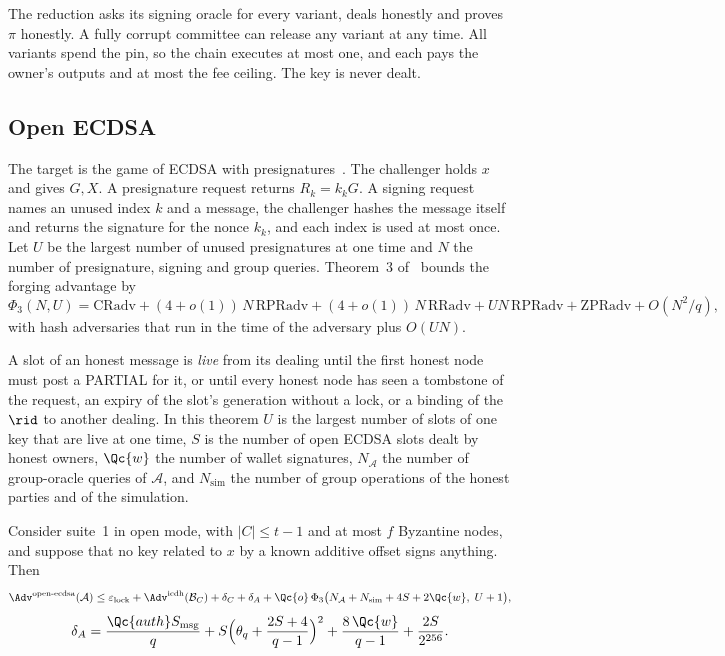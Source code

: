 The reduction asks its signing oracle for every variant, deals honestly and proves $\pi$ honestly. A fully corrupt committee can release any variant at any time. All variants spend the pin, so the chain executes at most one, and each pays the owner's outputs and at most the fee ceiling. The key is never dealt.

\subsection{Open ECDSA}\label{sec:sec-ecdsa}

The target is the game of ECDSA with presignatures~\cite[Figure~4]{GS21}. The challenger holds $x$ and gives $G, X$. A presignature request returns $R_k = k_k G$. A signing request names an unused index $k$ and a message, the challenger hashes the message itself and returns the signature for the nonce $k_k$, and each index is used at most once. Let $U$ be the largest number of unused presignatures at one time and $N$ the number of presignature, signing and group queries. Theorem~3 of~\cite{GS21} bounds the forging advantage by
\[
  \Phi_3(N, U) = \mathrm{CRadv} + (4 + o(1))\,N\,\mathrm{RPRadv} + (4 + o(1))\,N\,\mathrm{RRadv} + U N\,\mathrm{RPRadv} + \mathrm{ZPRadv} + O(N^2/q),
\]
with hash adversaries that run in the time of the adversary plus $O(UN)$.

A slot of an honest message is \emph{live} from its dealing until the first honest node must post a PARTIAL for it, or until every honest node has seen a tombstone of the request, an expiry of the slot's generation without a lock, or a binding of the $\rid$ to another dealing. In this theorem $U$ is the largest number of slots of one key that are live at one time, $S$ is the number of open ECDSA slots dealt by honest owners, $\Qc{w}$ the number of wallet signatures, $N_{\mathcal{A}}$ the number of group-oracle queries of $\mathcal{A}$, and $N_{\mathrm{sim}}$ the number of group operations of the honest parties and of the simulation.

\begin{theorem}\label{thm:ecdsa}
Consider suite~1 in open mode, with $|C| \le t-1$ and at most $f$ Byzantine nodes, and suppose that no key related to $x$ by a known additive offset signs anything. Then
\[
  \Adv^{\mathrm{open\text{-}ecdsa}}(\mathcal{A}) \le \varepsilon_{\mathrm{lock}} + \Adv^{\mathrm{icdh}}(\mathcal{B}_C) + \delta_C + \delta_A + \Qc{o}\,\Phi_3\bigl(N_{\mathcal{A}} + N_{\mathrm{sim}} + 4S + 2\Qc{w},\; U + 1\bigr),
\]
\[
  \delta_A = \frac{\Qc{auth} S_{\mathrm{msg}}}{q} + S\Bigl(\theta_q + \frac{2S + 4}{q - 1}\Bigr)^{2} + \frac{8\,\Qc{w}}{q-1} + \frac{2S}{2^{256}} .
\]
\end{theorem}

